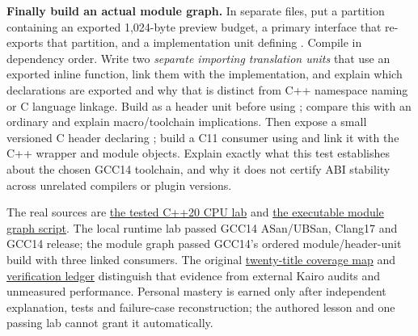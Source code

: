 \textbf{Finally build an actual module graph.} In separate files, put a  partition containing an exported 1,024-byte preview budget, a primary  interface that re-exports that partition, and a  implementation unit defining . Compile in dependency order. Write two \emph{separate importing translation units} that use an exported inline function, link them with the implementation, and explain which declarations are exported and why that is distinct from C++ namespace naming or C language linkage. Build  as a header unit before using ; compare this with an ordinary  and explain macro/toolchain implications. Then expose a small versioned C header declaring ; build a C11 consumer using  and link it with the C++ wrapper and module objects. Explain exactly what this test establishes about the chosen GCC14 toolchain, and why it does not certify ABI stability across unrelated compilers or plugin versions.

The real sources are \hyperref[source-file-a1c76c44bc377537c732f5c4]{the tested C++20 CPU lab} and \hyperref[source-file-e1b7c3e4f52da0e7c9c36a41]{the executable module graph script}. The local runtime lab passed GCC14 ASan/UBSan, Clang17 and GCC14 release; the module graph passed GCC14's ordered module/header-unit build with three linked consumers. The original \hyperref[appendix-fd090d982a15-m017-parts-271290-lazy-asset-queries-allocation-lifetimes-and-compiled-api-boundaries]{twenty-title coverage map} and \hyperref[appendix-a103e7846d21-phase-7-additive-reconstruction-m017-parts-271290]{verification ledger} distinguish that evidence from external Kairo audits and unmeasured performance. Personal mastery is earned only after independent explanation, tests and failure-case reconstruction; the authored lesson and one passing lab cannot grant it automatically.

